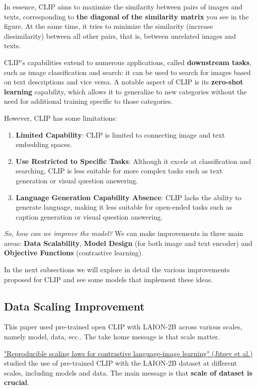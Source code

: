 In essence, CLIP aims to maximize the similarity between pairs of images and texts, corresponding to \textbf{\textcolor{mybluee}{the diagonal of the similarity matrix}} you see in the figure. At the same time, it tries to minimize the similarity (increase dissimilarity) between all other pairs, that is, between unrelated images and texts. 

CLIP's capabilities extend to numerous applications, called \textbf{downstream tasks}, such as image classification and search: it can be used to search for images based on text descriptions and vice versa. A notable aspect of CLIP is its \textbf{zero-shot learning} capability, which allows it to generalize to new categories without the need for additional training specific to those categories. 

However, CLIP has some limitations:
\begin{enumerate}
    \item \textbf{Limited Capability}: CLIP is limited to connecting image and text embedding spaces.
    \item \textbf{Use Restricted to Specific Tasks}: Although it excels at classification and searching, CLIP is less suitable for more complex tasks such as text generation or visual question answering.
    \item \textbf{Language Generation Capability Absence}: CLIP lacks the ability to generate language, making it less suitable for open-ended tasks such as caption generation or visual question answering.
\end{enumerate}

\textit{So, how can we improve the model?} We can make improvements in three main areas: \textbf{Data Scalability}, \textbf{Model Design} (for both image and text encoder) and \textbf{Objective Functions} (contrastive learning).

In the next subsections we will explore in detail the various improvements proposed for CLIP and see some models that implement these ideas.


\subsection{Data Scaling Improvement}

 This paper used pre-trained open CLIP with LAION-2B across various scales, namely model, data, ecc..
The take home message is that scale matter.

\href{https://arxiv.org/pdf/2212.07143}{"Reproducible scaling laws for contrastive language-image learning" (Jitsev et al.)} studied the use of pre-trained CLIP with the LAION-2B dataset at different scales, including models and data. The main message is that \textbf{scale of dataset is crucial}.

